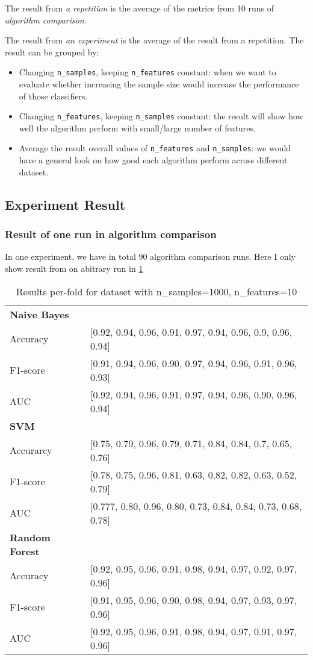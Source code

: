 \documentclass[conference]{IEEEtran}
\begin{document}
The result from \textit{a repetition} is the average of the metrics from 10 runs of \textit{algorithm comparison}.

The result from \textit{an experiment} is the average of the result from a repetition. The result can be grouped by:

\begin{itemize}
\item Changing \texttt{n\_samples}, keeping \texttt{n\_features} constant: when we want to evaluate whether increasing the sample size would increase the performance of those classifiers.
\item Changing \texttt{n\_features}, keeping \texttt{n\_samples} constant: the result will show how well the algorithm perform with small/large number of features.
\item Average the result overall values of \texttt{n\_features} and \texttt{n\_samples}: we would have a general look on how good each algorithm perform across different dataset.
\end{itemize}

\subsection{Experiment Result}
\subsubsection*{Result of one run in algorithm comparison}
In one experiment, we have in total 90 algorithm comparison runs. Here I only show result from on abitrary run in \cref{tab:result_algo_comparison}

\begin{table}[h]
\centering
\caption{Results per-fold for dataset with n\_samples=1000, n\_features=10}
\label{tab:result_algo_comparison}
\begin{tabular}{l|l}
\midrule
\textbf{Naive Bayes} & \\
Accuracy & [0.92, 0.94, 0.96, 0.91, 0.97, 0.94, 0.96, 0.9, 0.96, 0.94] \\
F1-score & [0.91, 0.94, 0.96, 0.90, 0.97, 0.94, 0.96, 0.91, 0.96, 0.93] \\
AUC &      [0.92, 0.94, 0.96, 0.91, 0.97, 0.94, 0.96, 0.90, 0.96, 0.94] \\
\midrule
\textbf{SVM} & \\
Accurarcy & [0.75, 0.79, 0.96, 0.79, 0.71, 0.84, 0.84, 0.7, 0.65, 0.76] \\
F1-score & [0.78, 0.75, 0.96, 0.81, 0.63, 0.82, 0.82, 0.63, 0.52, 0.79] \\
AUC & [0.777, 0.80, 0.96, 0.80, 0.73, 0.84, 0.84, 0.73, 0.68, 0.78] \\
\midrule
\textbf{Random Forest} & \\
Accuracy & [0.92, 0.95, 0.96, 0.91, 0.98, 0.94, 0.97, 0.92, 0.97, 0.96] \\
F1-score & [0.91, 0.95, 0.96, 0.90, 0.98, 0.94, 0.97, 0.93, 0.97, 0.96] \\
AUC & [0.92, 0.95, 0.96, 0.91, 0.98, 0.94, 0.97, 0.91, 0.97, 0.96] \\
\bottomrule
\end{tabular}
\end{table}
\end{document}

